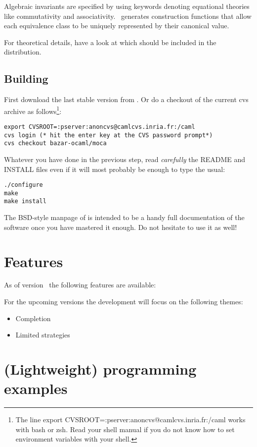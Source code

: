 \documentclass{article}
\begin{document}
Algebraic invariants are specified by using keywords denoting
equational theories like commutativity and associativity. \moca\
generates construction functions that allow each equivalence class to
be uniquely represented by their canonical value.

For theoretical details, have a look at \cite{moca07} which should be
included in the distribution.

\subsection{Building \moca}

First download the last stable version from \mocaweb. Or do a checkout
of the current cvs archive as follows\footnote{The line {\sf export
    CVSROOT=:pserver:anoncvs@camlcvs.inria.fr:/caml} works with {\sf
    bash} or {\sf zsh}. Read your shell manual if you do not know how
  to set environment variables with your shell.}:

\begin{verbatim}
export CVSROOT=:pserver:anoncvs@camlcvs.inria.fr:/caml
cvs login (* hit the enter key at the CVS password prompt*)
cvs checkout bazar-ocaml/moca
\end{verbatim}

Whatever you have done in the previous step, read {\em carefully} the
README and INSTALL files even if it will most probably be enough to
type the usual: 
\begin{verbatim}
./configure
make
make install
\end{verbatim}

The BSD-style manpage of \moca is intended to be a handy full documentation of
the software once you have mastered it enough. Do not hesitate to use
it as well!

\section{Features}
\label{sec:features}

As of version \vnumber\ the following features are available:

For the upcoming versions the development will focus on the following themes:
\begin{itemize}
\item Completion
\item Limited strategies
\end{itemize}


\section{(Lightweight) programming examples}
\label{sec:lipex}
\end{document}
